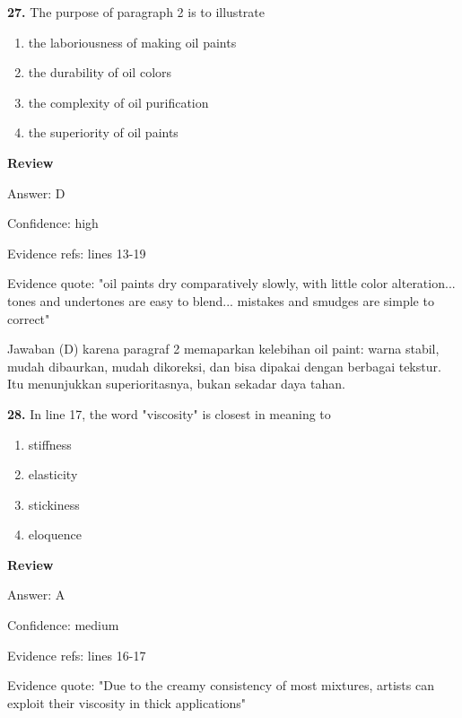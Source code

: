 \documentclass[12pt]{article}
\begin{document}
\endgroup
\par
\vspace{0.25\baselineskip}
\noindent\textbf{27.} The purpose of paragraph 2 is to illustrate
\begin{enumerate}[label=(\Alph*),leftmargin=*,itemsep=0.2em]
\item the laboriousness of making oil paints
\item the durability of oil colors
\item the complexity of oil purification
\item the superiority of oil paints
\end{enumerate}
\par
\begingroup
\setlength{\parskip}{0pt}
\setlength{\parindent}{0pt}
\textbf{Review}\par
Answer: D\par
Confidence: high\par
Evidence refs: lines 13-19\par
Evidence quote: "oil paints dry comparatively slowly, with little color alteration... tones and undertones are easy to blend... mistakes and smudges are simple to correct"\par
Jawaban (D) karena paragraf 2 memaparkan kelebihan oil paint: warna stabil, mudah dibaurkan, mudah dikoreksi, dan bisa dipakai dengan berbagai tekstur. Itu menunjukkan superioritasnya, bukan sekadar daya tahan.\par
\endgroup
\par
\vspace{0.25\baselineskip}
\noindent\textbf{28.} In line 17, the word "viscosity" is closest in meaning to
\begin{enumerate}[label=(\Alph*),leftmargin=*,itemsep=0.2em]
\item stiffness
\item elasticity
\item stickiness
\item eloquence
\end{enumerate}
\par
\begingroup
\setlength{\parskip}{0pt}
\setlength{\parindent}{0pt}
\textbf{Review}\par
Answer: A\par
Confidence: medium\par
Evidence refs: lines 16-17\par
Evidence quote: "Due to the creamy consistency of most mixtures, artists can exploit their viscosity in thick applications"\par
\end{document}
